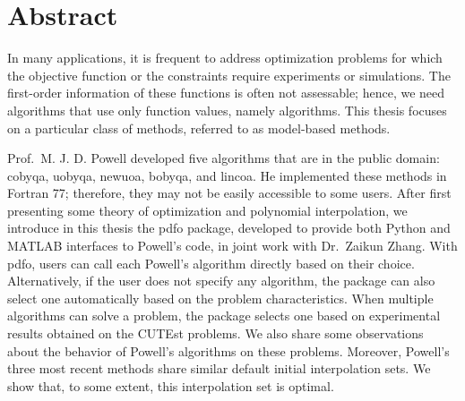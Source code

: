 %
%
%
\chapter*{Abstract}
\label{ch:abstract}

In many applications, it is frequent to address optimization problems for which the objective function or the constraints require experiments or simulations.
The first-order information of these functions is often not assessable; hence, we need algorithms that use only function values, namely  algorithms.
This thesis focuses on a particular class of  methods, referred to as model-based methods.

Prof.\ M. J. D. Powell developed five  algorithms that are in the public domain: \gls{cobyqa}, \gls{uobyqa}, \gls{newuoa}, \gls{bobyqa}, and \gls{lincoa}.
He implemented these methods in Fortran 77; therefore, they may not be easily accessible to some users.
After first presenting some theory of optimization and polynomial interpolation, we introduce in this thesis the \gls{pdfo} package, developed to provide both Python and MATLAB interfaces to Powell's code, in joint work with Dr.\ Zaikun Zhang.
With \gls{pdfo}, users can call each Powell's algorithm directly based on their choice.
Alternatively, if the user does not specify any algorithm, the package can also select one automatically based on the problem characteristics.
When multiple algorithms can solve a problem, the package selects one based on experimental results obtained on the CUTEst problems.
We also share some observations about the behavior of Powell's algorithms on these problems.
Moreover, Powell's three most recent methods share similar default initial interpolation sets.
We show that, to some extent, this interpolation set is optimal.

